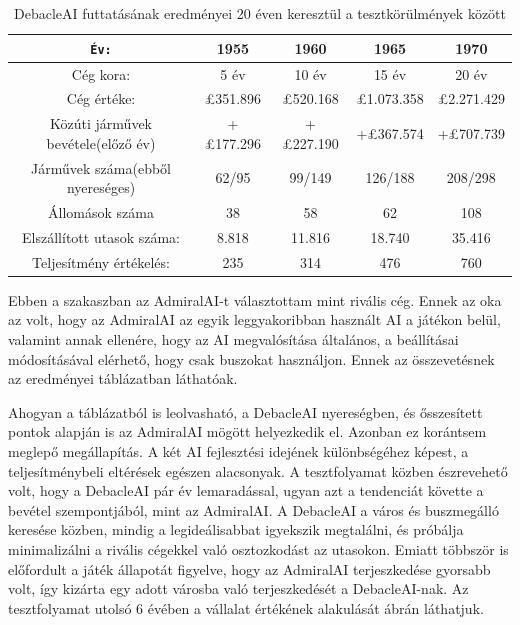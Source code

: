 \begin{table}
	\centering
	\begin{tabular}{|c || c | c | c | c |} 
		\hline
		\texttt{Év:} & 1955 & 1960 & 1965 & 1970 \\ 
		\hline\hline
		Cég kora: & 5 év & 10 év & 15 év & 20 év  \\ 
		\hline
		Cég értéke: &  \pounds 351.896 & \pounds 520.168  & \pounds 1.073.358 & \pounds 2.271.429\\
		\hline
		Közúti járművek bevétele(előző év) & +\pounds 177.296 & +\pounds 227.190  & +\pounds 367.574 & +\pounds 707.739 \\
		\hline
		Járművek száma(ebből nyereséges) & 62/95 & 99/149 & 126/188 & 208/298 \\
		\hline
		Állomások száma & 38 & 58 & 62 & 108 \\ 
		\hline
		Elszállított utasok száma: & 8.818 & 11.816 & 18.740 & 35.416  \\
		\hline
		Teljesítmény értékelés: & 235 & 314 & 476 & 760 \\ 
		\hline
	\end{tabular}
	\caption{DebacleAI futtatásának eredményei 20 éven keresztül a tesztkörülmények között}
	\label{tab:debacle20} 
\end{table}


Ebben a szakaszban az AdmiralAI-t választottam mint rivális cég. Ennek az oka az volt, hogy az AdmiralAI az egyik leggyakoribban használt AI a játékon belül, valamint annak ellenére, hogy az AI megvalósítása általános, a beállításai módosításával elérhető, hogy csak buszokat használjon. Ennek az összevetésnek az eredményei  táblázatban láthatóak.

Ahogyan a táblázatból is leolvasható, a DebacleAI nyereségben, és ősszesített pontok alapján is az AdmiralAI mögött helyezkedik el. Azonban ez korántsem meglepő megállapítás. A két AI fejlesztési idejének különbségéhez képest, a teljesítménybeli eltérések egészen alacsonyak. A tesztfolyamat közben észrevehető volt, hogy a DebacleAI pár év lemaradással, ugyan azt a tendenciát követte a bevétel szempontjából, mint az AdmiralAI. A DebacleAI a város és buszmegálló keresése közben, mindig a legideálisabbat igyekszik megtalálni, és próbálja minimalizálni a rivális cégekkel való osztozkodást az utasokon. Emiatt többször is előfordult a játék állapotát figyelve, hogy az AdmiralAI terjeszkedése gyorsabb volt, így kizárta egy adott városba való terjeszkedését a DebacleAI-nak. Az tesztfolyamat utolsó 6 évében a vállalat értékének alakulását  ábrán láthatjuk.

